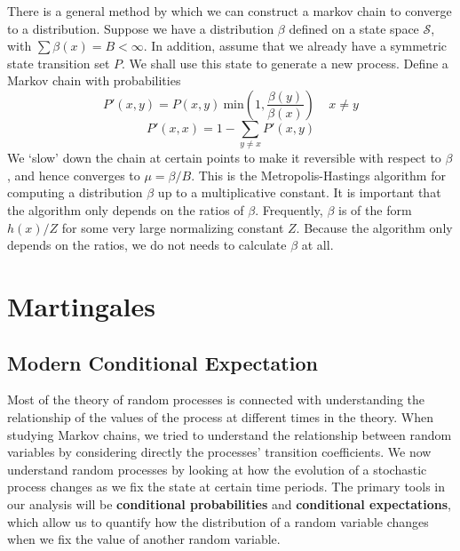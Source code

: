 There is a general method by which we can construct a markov chain to converge to a distribution. Suppose we have a distribution $\beta$ defined on a state space $\mathcal{S}$, with $\sum \beta(x) = B < \infty$. In addition, assume that we already have a symmetric state transition set $P$. We shall use this state to generate a new process. Define a Markov chain with probabilities
%
\[ P'(x,y) = P(x,y)\ \text{min}(1, \frac{\beta(y)}{\beta(x)})\ \ \ \ \ x \neq y \]
%
\[ P'(x,x) = 1 - \sum_{y \neq x} P'(x,y) \]
%
We `slow' down the chain at certain points to make it reversible with respect to $\beta$, and hence converges to $\mu = \beta/B$. This is the Metropolis-Hastings algorithm for computing a distribution $\beta$ up to a multiplicative constant. It is important that the algorithm only depends on the ratios of $\beta$. Frequently, $\beta$ is of the form $h(x)/Z$ for some very large normalizing constant $Z$. Because the algorithm only depends on the ratios, we do not needs to calculate $\beta$ at all.





\chapter{Martingales}

\section{Modern Conditional Expectation}

Most of the theory of random processes is connected with understanding the relationship of the values of the process at different times in the theory. When studying Markov chains, we tried to understand the relationship between random variables by considering directly the processes' transition coefficients. We now understand random processes by looking at how the evolution of a stochastic process changes as we fix the state at certain time periods. The primary tools in our analysis will be {\bf conditional probabilities} and {\bf conditional expectations}, which allow us to quantify how the distribution of a random variable changes when we fix the value of another random variable.


